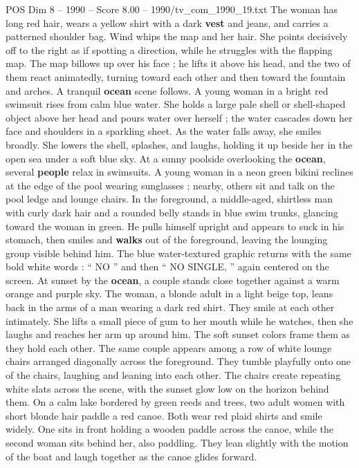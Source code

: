 \begin{textsample}{POS Dim 8 – 1990 – Score 8.00 – 1990/tv\_com\_1990\_19.txt}
The woman has long red hair, wears a yellow shirt with a dark \textbf{vest} and jeans, and carries a patterned shoulder bag.
Wind whips the map and her hair.
She points decisively off to the right as if spotting a direction, while he struggles with the flapping map.
The map billows up over his face ; he lifts it above his head, and the two of them react animatedly, turning toward each other and then toward the fountain and arches.
A tranquil \textbf{ocean} scene follows.
A young woman in a bright red swimsuit rises from calm blue water.
She holds a large pale shell or shell-shaped object above her head and pours water over herself ; the water cascades down her face and shoulders in a sparkling sheet.
As the water falls away, she smiles broadly.
She lowers the shell, splashes, and laughs, holding it up beside her in the open sea under a soft blue sky.
At a sunny poolside overlooking the \textbf{ocean}, several \textbf{people} relax in swimsuits.
A young woman in a neon green bikini reclines at the edge of the pool wearing sunglasses ; nearby, others sit and talk on the pool ledge and lounge chairs.
In the foreground, a middle-aged, shirtless man with curly dark hair and a rounded belly stands in blue swim trunks, glancing toward the woman in green.
He pulls himself upright and appears to suck in his stomach, then smiles and \textbf{walks} out of the foreground, leaving the lounging group visible behind him.
The blue water-textured graphic returns with the same bold white words : “ NO ” and then “ NO SINGLE, ” again centered on the screen.
At sunset by the \textbf{ocean}, a couple stands close together against a warm orange and purple sky.
The woman, a blonde adult in a light beige top, leans back in the arms of a man wearing a dark red shirt.
They smile at each other intimately.
She lifts a small piece of gum to her mouth while he watches, then she laughs and reaches her arm up around him.
The soft sunset colors frame them as they hold each other.
The same couple appears among a row of white lounge chairs arranged diagonally across the foreground.
They tumble playfully onto one of the chairs, laughing and leaning into each other.
The chairs create repeating white slats across the scene, with the sunset glow low on the horizon behind them.
On a calm lake bordered by green reeds and trees, two adult women with short blonde hair paddle a red canoe.
Both wear red plaid shirts and smile widely.
One sits in front holding a wooden paddle across the canoe, while the second woman sits behind her, also paddling.
They lean slightly with the motion of the boat and laugh together as the canoe glides forward.

\end{textsample}
